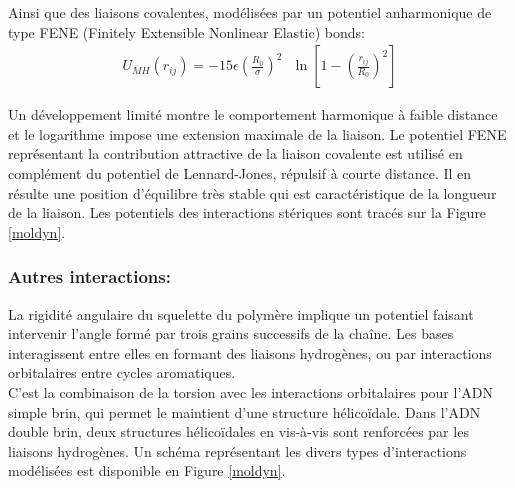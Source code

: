 \documentclass[a4paper,11pt]{article}
\begin{document}
Ainsi que des liaisons covalentes, modélisées par un potentiel anharmonique de type FENE (Finitely Extensible Nonlinear Elastic) bonds:
\begin{eqnarray}
U_{MH}(r_{ij})= -15\epsilon \left(\frac{R_0}{\sigma}\right)^2\text{ } \ln\left[1-\left(\frac{r_{ij}}{R_0}\right)^2\right]
\end{eqnarray}


Un développement limité montre le comportement harmonique à faible distance et le logarithme impose une extension maximale de la liaison. Le potentiel FENE représentant la contribution attractive de la liaison covalente est utilisé en complément du potentiel de Lennard-Jones, répulsif à courte distance. Il en résulte une position d'équilibre très stable qui est caractéristique de la longueur de la liaison. Les potentiels des interactions stériques sont tracés sur la Figure \ref{moldyn}.


\subsubsection*{Autres interactions:}

La rigidité angulaire du squelette du polymère implique un potentiel faisant  intervenir l'angle formé par trois grains successifs de la chaîne. Les bases interagissent entre elles en formant des liaisons hydrogènes, ou par interactions orbitalaires entre cycles aromatiques.\\

 C'est la combinaison de la torsion avec les interactions orbitalaires pour l'ADN simple brin, qui permet le maintient d'une structure hélicoïdale. Dans l'ADN double brin, deux structures hélicoïdales en vis-à-vis sont renforcées par les liaisons hydrogènes. Un schéma représentant les divers types d'interactions modélisées est disponible en Figure \ref{moldyn}.\\
\end{document}
